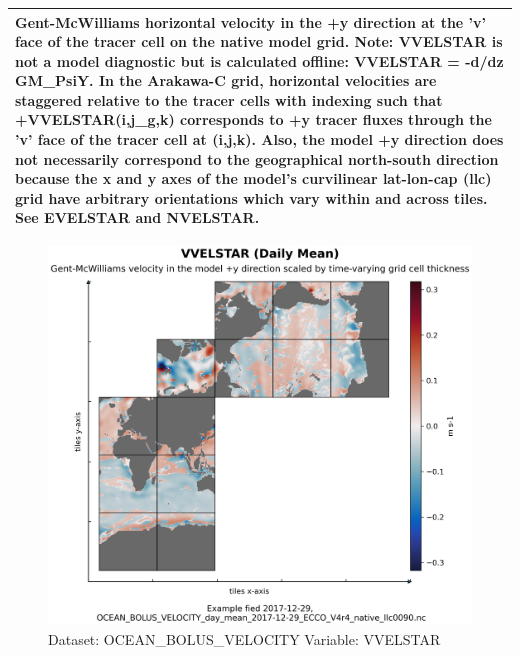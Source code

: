 \begin{longtable}{|m{}|m{}|m{}|m{}|}
\multicolumn{4}{|p{1\textwidth}|}{Gent-McWilliams horizontal velocity in the +y direction at the 'v' face of the tracer cell on the native model grid. Note: VVELSTAR is not a model diagnostic but is calculated offline: VVELSTAR = -d/dz GM\_PsiY. In the Arakawa-C grid, horizontal velocities are staggered relative to the tracer cells with indexing such that +VVELSTAR(i,j\_g,k) corresponds to +y tracer fluxes through the 'v' face of the tracer cell at (i,j,k). Also, the model +y direction does not necessarily correspond to the geographical north-south direction because the x and y axes of the model's curvilinear lat-lon-cap (llc) grid have arbitrary orientations which vary within and across tiles. See EVELSTAR and NVELSTAR.} \\ \hline
\end{longtable}

\begin{figure}[H]
\centering
\includegraphics[scale=0.55]{../images/plots/native_plots/Gent-McWilliams_Ocean_Bolus_Velocity/VVELSTAR.png}
\caption{Dataset: OCEAN\_BOLUS\_VELOCITY Variable: VVELSTAR}
\label{tab:table-OCEAN_BOLUS_VELOCITY_VVELSTAR-Plot}
\end{figure}
\pagebreak
